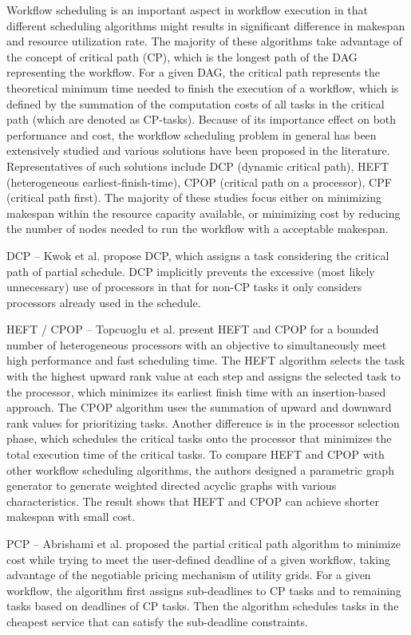 Workflow scheduling is an important aspect in workflow execution in that different scheduling algorithms might results in significant difference in makespan and resource utilization rate. The majority of these algorithms take advantage of the concept of critical path (CP), which is the longest path of the DAG representing the workflow. For a given DAG, the critical path represents the theoretical minimum time needed to finish the execution of a workflow, which is defined by the summation of the computation costs of all tasks in the critical path (which are denoted as CP-tasks). Because of its importance effect on both performance and cost, the workflow scheduling problem in general has been extensively studied and various solutions have been proposed in the literature. Representatives of such solutions include DCP (dynamic critical path), HEFT (heterogeneous earliest-finish-time), CPOP (critical path on a processor), CPF (critical path first). The majority of these studies focus either on minimizing makespan within the resource capacity available, or minimizing cost by reducing the number of nodes needed to run the workflow with a acceptable makespan. 

DCP -- Kwok et al. \cite{kwok1996dynamic} propose DCP, which assigns a task considering the critical path of partial schedule. DCP implicitly prevents the excessive (most likely unnecessary) use of processors in that for non-CP tasks it only considers processors already used in the schedule. 

HEFT / CPOP -- Topcuoglu et al. \cite{topcuoglu2002performance} present HEFT and CPOP for a bounded number of heterogeneous processors with an objective to simultaneously meet high performance and fast scheduling time. The HEFT algorithm selects the task with the highest upward rank value at each step and assigns the selected task to the processor, which minimizes its earliest finish time with an insertion-based approach. The CPOP algorithm uses the summation of upward and downward rank values for prioritizing tasks. Another difference is in the processor selection phase, which schedules the critical tasks onto the processor that minimizes the total execution time of the critical tasks. To compare HEFT and CPOP with other workflow scheduling algorithms, the authors designed a parametric graph generator to generate weighted directed acyclic graphs with various characteristics. The result shows that HEFT and CPOP can achieve shorter makespan with small cost.

PCP -- Abrishami et al. \cite{abrishami2012cost} proposed the partial critical path algorithm to minimize cost while trying to meet the user-defined deadline of a given workflow, taking advantage of the negotiable pricing mechanism of utility grids. For a given workflow, the algorithm first assigns sub-deadlines to CP tasks and to remaining tasks based on deadlines of CP tasks. Then the algorithm schedules tasks in the cheapest service that can satisfy the sub-deadline constraints. 

